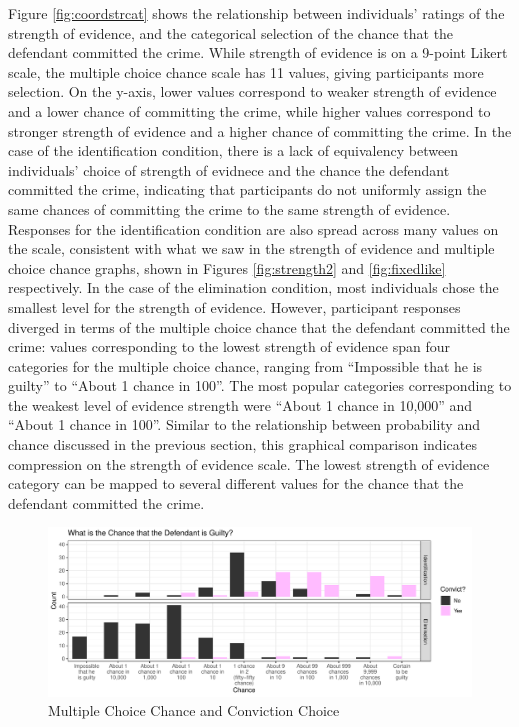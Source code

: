 \documentclass[print]{nuthesis}
\begin{document}
Figure \ref{fig:coordstrcat} shows the relationship between individuals' ratings of the strength of evidence, and the categorical selection of the chance that the defendant committed the crime.
While strength of evidence is on a 9-point Likert scale, the multiple choice chance scale has 11 values, giving participants more selection.
On the y-axis, lower values correspond to weaker strength of evidence and a lower chance of committing the crime, while higher values correspond to stronger strength of evidence and a higher chance of committing the crime.
In the case of the identification condition, there is a lack of equivalency between individuals' choice of strength of evidnece and the chance the defendant committed the crime, indicating that participants do not uniformly assign the same chances of committing the crime to the same strength of evidence.
Responses for the identification condition are also spread across many values on the scale, consistent with what we saw in the strength of evidence and multiple choice chance graphs, shown in Figures \ref{fig:strength2} and \ref{fig:fixedlike} respectively.
In the case of the elimination condition, most individuals chose the smallest level for the strength of evidence.
However, participant responses diverged in terms of the multiple choice chance that the defendant committed the crime: values corresponding to the lowest strength of evidence span four categories for the multiple choice chance, ranging from ``Impossible that he is guilty'' to ``About 1 chance in 100''.
The most popular categories corresponding to the weakest level of evidence strength were ``About 1 chance in 10,000'' and ``About 1 chance in 100''.
Similar to the relationship between probability and chance discussed in the previous section, this graphical comparison indicates compression on the strength of evidence scale.
The lowest strength of evidence category can be mapped to several different values for the chance that the defendant committed the crime.

\begin{figure}

{\centering \includegraphics[width=\linewidth]{thesis_files/figure-latex/convictlike-1} 

}

\caption{Multiple Choice Chance and Conviction Choice}\label{fig:convictlike}
\end{figure}
\end{document}
